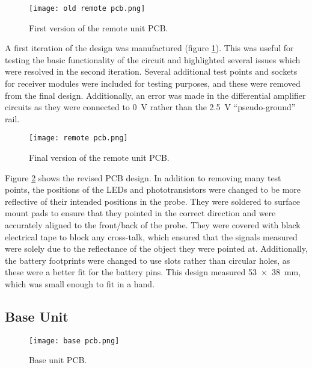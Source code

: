 \begin{figure}[htb]
	\centering
	\texttt{[image: old remote pcb.png]}
	\caption{First version of the remote unit PCB.}
	\label{fig: old remote pcb}
\end{figure}

A first iteration of the design was manufactured (figure \ref{fig: old remote pcb}). This was useful for testing the basic functionality of the circuit and highlighted several issues which were resolved in the second iteration. Several additional test points and sockets for receiver modules were included for testing purposes, and these were removed from the final design. Additionally, an error was made in the differential amplifier circuits as they were connected to \SI{0}{\volt} rather than the \SI{2.5}{\volt} ``pseudo-ground'' rail. \\



\begin{figure}[htb]
	\centering
	\texttt{[image: remote pcb.png]}
	\caption{Final version of the remote unit PCB.}
	\label{fig: remote pcb}
\end{figure}

Figure \ref{fig: remote pcb} shows the revised PCB design. In addition to removing many test points, the positions of the LEDs and phototransistors were changed to be more reflective of their intended positions in the probe. They were soldered to surface mount pads to ensure that they pointed in the correct direction and were accurately aligned to the front/back of the probe. They were covered with black electrical tape to block any cross-talk, which ensured that the signals measured were solely due to the reflectance of the object they were pointed at. Additionally, the battery footprints were changed to use slots rather than circular holes, as these were a better fit for the battery pins. This design measured \SI{53x38}{\milli\metre}, which was small enough to fit in a hand.





\FloatBarrier
\subsection{Base Unit}
\begin{figure}[h!]
	\centering
	\texttt{[image: base pcb.png]}
	\caption{Base unit PCB.}
	\label{fig: base pcb}
\end{figure}


